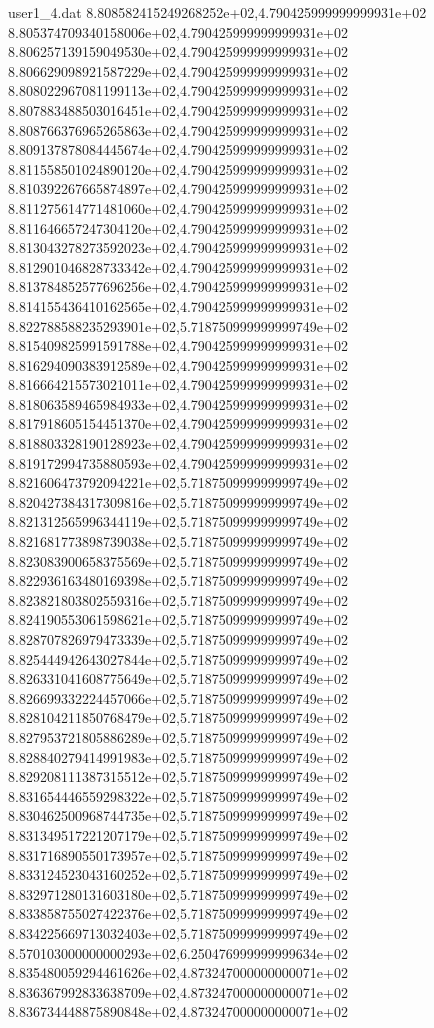 \begin{filecontents}{user1_4.dat}
8.808582415249268252e+02,4.790425999999999931e+02
8.805374709340158006e+02,4.790425999999999931e+02
8.806257139159049530e+02,4.790425999999999931e+02
8.806629098921587229e+02,4.790425999999999931e+02
8.808022967081199113e+02,4.790425999999999931e+02
8.807883488503016451e+02,4.790425999999999931e+02
8.808766376965265863e+02,4.790425999999999931e+02
8.809137878084445674e+02,4.790425999999999931e+02
8.811558501024890120e+02,4.790425999999999931e+02
8.810392267665874897e+02,4.790425999999999931e+02
8.811275614771481060e+02,4.790425999999999931e+02
8.811646657247304120e+02,4.790425999999999931e+02
8.813043278273592023e+02,4.790425999999999931e+02
8.812901046828733342e+02,4.790425999999999931e+02
8.813784852577696256e+02,4.790425999999999931e+02
8.814155436410162565e+02,4.790425999999999931e+02
8.822788588235293901e+02,5.718750999999999749e+02
8.815409825991591788e+02,4.790425999999999931e+02
8.816294090383912589e+02,4.790425999999999931e+02
8.816664215573021011e+02,4.790425999999999931e+02
8.818063589465984933e+02,4.790425999999999931e+02
8.817918605154451370e+02,4.790425999999999931e+02
8.818803328190128923e+02,4.790425999999999931e+02
8.819172994735880593e+02,4.790425999999999931e+02
8.821606473792094221e+02,5.718750999999999749e+02
8.820427384317309816e+02,5.718750999999999749e+02
8.821312565996344119e+02,5.718750999999999749e+02
8.821681773898739038e+02,5.718750999999999749e+02
8.823083900658375569e+02,5.718750999999999749e+02
8.822936163480169398e+02,5.718750999999999749e+02
8.823821803802559316e+02,5.718750999999999749e+02
8.824190553061598621e+02,5.718750999999999749e+02
8.828707826979473339e+02,5.718750999999999749e+02
8.825444942643027844e+02,5.718750999999999749e+02
8.826331041608775649e+02,5.718750999999999749e+02
8.826699332224457066e+02,5.718750999999999749e+02
8.828104211850768479e+02,5.718750999999999749e+02
8.827953721805886289e+02,5.718750999999999749e+02
8.828840279414991983e+02,5.718750999999999749e+02
8.829208111387315512e+02,5.718750999999999749e+02
8.831654446559298322e+02,5.718750999999999749e+02
8.830462500968744735e+02,5.718750999999999749e+02
8.831349517221207179e+02,5.718750999999999749e+02
8.831716890550173957e+02,5.718750999999999749e+02
8.833124523043160252e+02,5.718750999999999749e+02
8.832971280131603180e+02,5.718750999999999749e+02
8.833858755027422376e+02,5.718750999999999749e+02
8.834225669713032403e+02,5.718750999999999749e+02
8.570103000000000293e+02,6.250476999999999634e+02
8.835480059294461626e+02,4.873247000000000071e+02
8.836367992833638709e+02,4.873247000000000071e+02
8.836734448875890848e+02,4.873247000000000071e+02

\end{filecontents}
